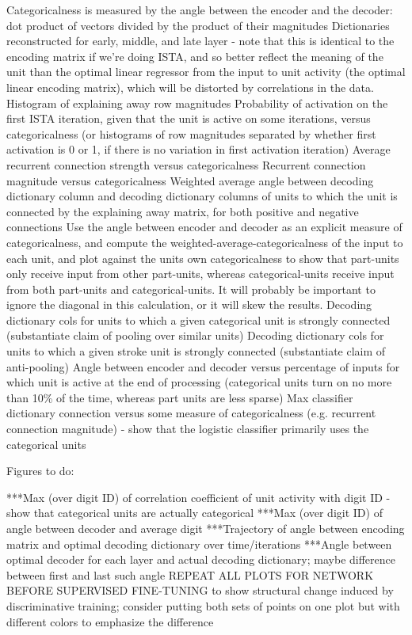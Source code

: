 Categoricalness is measured by the angle between the encoder and the decoder: dot product of vectors divided by the product of their magnitudes
Dictionaries reconstructed for early, middle, and late layer - note that this is identical to the encoding matrix if we're doing ISTA, and so better reflect the meaning of the unit than the optimal linear regressor from the input to unit activity (the optimal linear encoding matrix), which will be distorted by correlations in the data.
Histogram of explaining away row magnitudes
Probability of activation on the first ISTA iteration, given that the unit is active on some iterations, versus categoricalness (or histograms of row magnitudes separated by whether first activation is 0 or 1, if there is no variation in first activation iteration)
Average recurrent connection strength versus categoricalness
Recurrent connection magnitude versus categoricalness
Weighted average angle between decoding dictionary column and decoding dictionary columns of units to which the unit is connected by the explaining away matrix, for both positive and negative connections
Use the angle between encoder and decoder as an explicit measure of categoricalness, and compute the weighted-average-categoricalness of the input to each unit, and plot against the units own categoricalness to show that part-units only receive input from other part-units, whereas categorical-units receive input from both part-units and categorical-units.  It will probably be important to ignore the diagonal in this calculation, or it will skew the results.
Decoding dictionary cols for units to which a given categorical unit is strongly connected (substantiate claim of pooling over similar units)
Decoding dictionary cols for units to which a given stroke unit is strongly connected (substantiate claim of anti-pooling)
Angle between encoder and decoder versus percentage of inputs for which unit is active at the end of processing (categorical units turn on no more than 10\% of the time, whereas part units are less sparse)
Max classifier dictionary connection versus some measure of categoricalness (e.g. recurrent connection magnitude) - show that the logistic classifier primarily uses the categorical units


Figures to do:


***Max (over digit ID) of correlation coefficient of unit activity with digit ID - show that categorical units are actually categorical
***Max (over digit ID) of angle between decoder and average digit
***Trajectory of angle between encoding matrix and optimal decoding dictionary over time/iterations
***Angle between optimal decoder for each layer and actual decoding dictionary; maybe difference between first and last such angle
REPEAT ALL PLOTS FOR NETWORK BEFORE SUPERVISED FINE-TUNING to show structural change induced by discriminative training; consider putting both sets of points on one plot but with different colors to emphasize the difference


